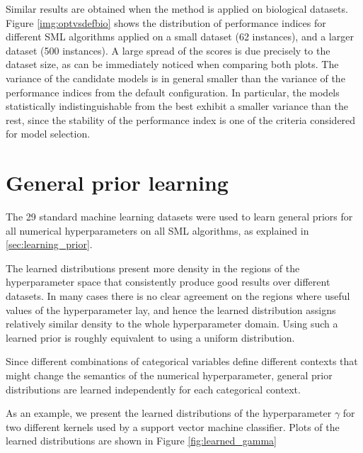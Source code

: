 Similar results are obtained when the method is applied on biological datasets. Figure
\ref{img:optvsdefbio} shows the distribution of performance indices for different SML algorithms
applied on a small dataset (62 instances), and a larger dataset (500 instances). A large spread of
the scores is due precisely to the dataset size, as can be immediately noticed when comparing
both plots. The variance of the candidate models is in general
smaller than the variance of the performance indices from the default configuration. In particular,
the models statistically indistinguishable from the best exhibit a smaller variance than the rest,
since the stability of the performance index is one of the criteria considered for model selection.

\section{General prior learning}

The 29 standard machine learning datasets were used to learn general priors for all numerical
hyperparameters on all SML algorithms, as explained in \ref{sec:learning_prior}. 

The learned distributions present more density in the regions of the hyperparameter space that
consistently produce good results over different datasets. In many cases there is no clear agreement
on the regions where useful values of the hyperparameter lay, and hence the learned distribution
assigns relatively similar density to the whole hyperparameter domain.  Using such a learned prior
is roughly equivalent to using a uniform distribution.

Since different combinations of categorical variables define different contexts that might change
the semantics of the numerical hyperparameter, general prior distributions are learned independently
for each categorical context.

As an example, we present the learned distributions of the hyperparameter $\gamma$ for two different
kernels used by a support vector machine classifier. Plots of the learned distributions are
shown in Figure \ref{fig:learned_gamma}


